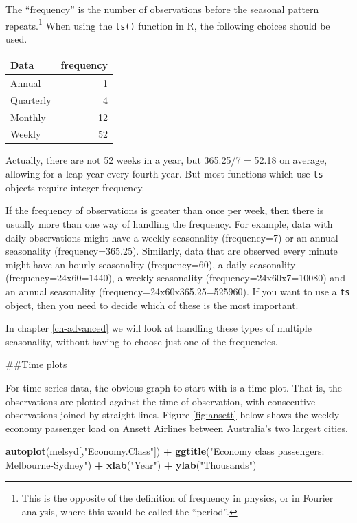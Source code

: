 \documentclass[]{book}
\newenvironment{Shaded}{\begin{snugshade}}{\end{snugshade}}
\newcommand{\KeywordTok}[1]{\textcolor[rgb]{0.13,0.29,0.53}{\textbf{#1}}}
\newcommand{\NormalTok}[1]{#1}
\newcommand{\OperatorTok}[1]{\textcolor[rgb]{0.81,0.36,0.00}{\textbf{#1}}}
\newcommand{\StringTok}[1]{\textcolor[rgb]{0.31,0.60,0.02}{#1}}
\let\rmarkdownfootnote\footnote%
\def\footnote{\protect\rmarkdownfootnote}
\begin{document}
The ``frequency'' is the number of observations before the seasonal pattern repeats.\footnote{This is the opposite of the definition of frequency in physics, or in Fourier analysis, where this would be called the ``period''.} When using the \texttt{ts()} function in R, the following choices should be used.

\begin{tabular}{lr}
\toprule
Data & frequency\\
\midrule
Annual & 1\\
Quarterly & 4\\
Monthly & 12\\
Weekly & 52\\
\bottomrule
\end{tabular}

Actually, there are not 52 weeks in a year, but 365.25/7 = 52.18 on average, allowing for a leap year every fourth year. But most functions which use \texttt{ts} objects require integer frequency.

If the frequency of observations is greater than once per week, then there is usually more than one way of handling the frequency. For example, data with daily observations might have a weekly seasonality (frequency=7) or an annual seasonality (frequency=365.25). Similarly, data that are observed every minute might have an hourly seasonality (frequency=60), a daily seasonality (frequency=24x60=1440), a weekly seasonality (frequency=24x60x7=10080) and an annual seasonality (frequency=24x60x365.25=525960). If you want to use a \texttt{ts} object, then you need to decide which of these is the most important.

In chapter \ref{ch-advanced} we will look at handling these types of multiple seasonality, without having to choose just one of the frequencies.

\#\#Time plots

For time series data, the obvious graph to start with is a time plot. That is, the observations are plotted against the time of observation, with consecutive observations joined by straight lines. Figure \ref{fig:ansett} below shows the weekly economy passenger load on Ansett Airlines between Australia's two largest cities.

\begin{Shaded}
\begin{Highlighting}[]
\KeywordTok{autoplot}\NormalTok{(melsyd[,}\StringTok{"Economy.Class"}\NormalTok{]) }\OperatorTok{+}
\StringTok{  }\KeywordTok{ggtitle}\NormalTok{(}\StringTok{"Economy class passengers: Melbourne-Sydney"}\NormalTok{) }\OperatorTok{+}
\StringTok{  }\KeywordTok{xlab}\NormalTok{(}\StringTok{"Year"}\NormalTok{) }\OperatorTok{+}\StringTok{ }\KeywordTok{ylab}\NormalTok{(}\StringTok{"Thousands"}\NormalTok{)}
\end{Highlighting}
\end{Shaded}
\end{document}

